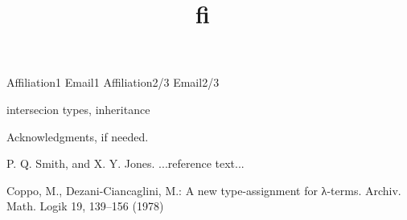 \documentclass[preprint]{sigplanconf}
\newcommand{\systemfi}{{\bf fi~}}
\begin{document}
\setlength{\pdfpageheight}{\paperheight}
\setlength{\pdfpagewidth}{\paperwidth}

\title{\systemfi}

           {Affiliation1}
           {Email1}
           {Affiliation2/3}
           {Email2/3}

\maketitle

\begin{abstract}
\end{abstract}

\keywords
intersecion types, inheritance











\acks

Acknowledgments, if needed.

\appendix

% 







\begin{thebibliography}{}
\softraggedright

P. Q. Smith, and X. Y. Jones. ...reference text...

Coppo, M., Dezani-Ciancaglini, M.: A new type-assignment for λ-terms. Archiv.
Math. Logik 19, 139–156 (1978)

\end{thebibliography}
\end{document}
